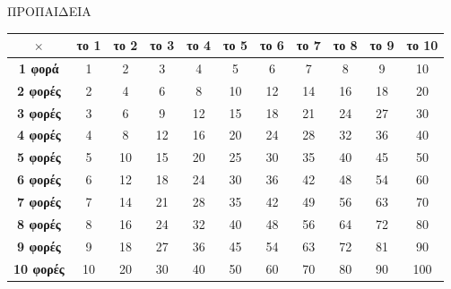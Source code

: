 \documentclass[10pt,a4paper,landscape]{article}
\begin{document}
\begin{center}
{\Large ΠΡΟΠΑΙΔΕΙΑ\\
\vspace{1cm}
\begin{tabular}{|c|c|c|c|c|c|c|c|c|c|c|}
\hline \rule[-2ex]{0pt}{5.5ex} $ \times $ & \textbf{το 1} & \textbf{το 2} & \textbf{το 3} & \textbf{το 4} & \textbf{το 5} & \textbf{το 6} & \textbf{το 7} & \textbf{το 8} & \textbf{το 9} & \textbf{το 10} \\ 
\hline \rule[-2ex]{0pt}{5.5ex} \textbf{1 φορά} & 1 & 2 & 3 & 4 & 5 & 6 & 7 & 8 & 9 & 10 \\ 
\hline \rule[-2ex]{0pt}{5.5ex} \textbf{2 φορές} & 2 & 4 & 6 & 8 & 10 & 12 & 14 & 16 & 18 & 20 \\ 
\hline \rule[-2ex]{0pt}{5.5ex} \textbf{3 φορές} & 3 & 6 & 9 & 12 & 15 & 18 & 21 & 24 & 27 & 30 \\ 
\hline \rule[-2ex]{0pt}{5.5ex} \textbf{4 φορές} & 4 & 8 & 12 & 16 & 20 & 24 & 28 & 32 & 36 & 40 \\ 
\hline \rule[-2ex]{0pt}{5.5ex} \textbf{5 φορές} & 5 & 10 & 15 & 20 & 25 & 30 & 35 & 40 & 45 & 50 \\ 
\hline \rule[-2ex]{0pt}{5.5ex} \textbf{6 φορές} & 6 & 12 & 18 & 24 & 30 & 36 & 42 & 48 & 54 & 60 \\ 
\hline \rule[-2ex]{0pt}{5.5ex} \textbf{7 φορές} & 7 & 14 & 21 & 28 & 35 & 42 & 49 & 56 & 63 & 70 \\ 
\hline \rule[-2ex]{0pt}{5.5ex} \textbf{8 φορές} & 8 & 16 & 24 & 32 & 40 & 48 & 56 & 64 & 72 & 80 \\ 
\hline \rule[-2ex]{0pt}{5.5ex} \textbf{9 φορές} & 9 & 18 & 27 & 36 & 45 & 54 & 63 & 72 & 81 & 90 \\ 
\hline \rule[-2ex]{0pt}{5.5ex} \textbf{10 φορές} & 10 & 20 & 30 & 40 & 50 & 60 & 70 & 80 & 90 & 100 \\ 
\hline 
\end{tabular} }
\end{center}
\end{document}
